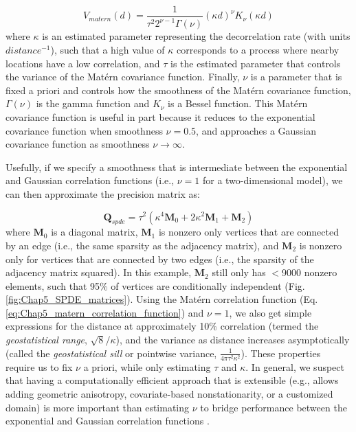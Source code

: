 \begin{equation} \label{eq:Chap5_matern_correlation_function}
    V_{matern}(d) = \frac{1}{\tau^2 2^{\nu-1} \Gamma(\nu)} (\kappa d)^{\nu} K_{\nu}(\kappa d)
\end{equation}
where \(\kappa\) is an estimated parameter representing the decorrelation rate (with units \(distance^{-1}\)), such that a high value of \(\kappa\) corresponds to a process where nearby locations have a low correlation, and \(\tau\) is the estimated parameter that controls the variance of the Matérn covariance function.  Finally, \(\nu\) is a parameter that is fixed a priori and controls how the smoothness of the Matérn covariance function, \(\Gamma(\nu)\) is the gamma function and \(K_{\nu}\) is a Bessel function.  This Matérn covariance function is useful in part because it reduces to the exponential covariance function when smoothness \(\nu = 0.5\), and approaches a Gaussian covariance function as smoothness \(\nu \rightarrow \infty\).  

Usefully, if we specify a smoothness that is intermediate between the exponential and Gaussian correlation functions (i.e., \(\nu = 1\) for a two-dimensional model), we can then approximate the precision matrix as:

\begin{equation} \label{eq:Chap5_SPDE_precision}
   \mathbf{Q}_{spde} = \tau^2 (\kappa^4 \mathbf{M}_0 + 2\kappa^2 \mathbf{M}_1 + \mathbf{M}_2)
\end{equation}
where \(\mathbf{M}_0\) is a diagonal matrix, \(\mathbf{M}_1\) is nonzero only vertices that are connected by an edge (i.e., the same sparsity as the adjacency matrix), and \(\mathbf{M}_2\) is nonzero only for vertices that are connected by two edges (i.e., the sparsity of the adjacency matrix squared).  In this example, \(\mathbf{M}_2\) still only has $<$9000 nonzero elements, such that 95\% of vertices are conditionally independent (Fig. \ref{fig:Chap5_SPDE_matrices}).  Using the Matérn correlation function (Eq. \ref{eq:Chap5_matern_correlation_function}) and \(\nu=1\), we also get simple expressions for the distance at approximately 10\% correlation (termed the \textit{geostatistical range}, \(\sqrt{8}/\kappa\)), and the variance as distance increases asymptotically (called the \textit{geostatistical sill} or pointwise variance, \(\frac{1}{4 \pi\tau^2 \kappa^2}\)).  These properties require us to fix \(\nu\) a priori, while only estimating \(\tau\) and \(\kappa\).  In general, we suspect that having a computationally efficient approach that is extensible (e.g., allows adding geometric anisotropy, covariate-based nonstationarity, or a customized domain) is more important than estimating \(\nu\) to bridge performance between the exponential and Gaussian correlation functions \cite{simpson_order_2012}. 


